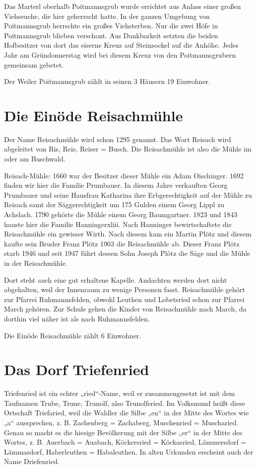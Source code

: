 \documentclass[12pt,a4pager]{book}
\begin{document}
Das Marterl oberhalb Poitmannsgrub wurde errichtet aus Anlass einer großen
Viehseuche, die hier geherrscht hatte. In der ganzen Umgebung von Poitmannsgrub
herrschte ein großes Viehsterben. Nur die zwei Höfe in Poitmannsgrub blieben
verschont. Aus Dankbarkeit setzten die beiden Hofbesitzer von dort das eiserne
Kreuz auf Steinsockel auf die Anhöhe. Jedes Jahr am Gründonnerstag wird bei
diesem Kreuz von den Poitmannsgrubern gemeinsam gebetet.

Der Weiler Poitmannsgrub zählt in seinen 3 Häusern 19 Einwohner.

\section{Die Einöde Reisachmühle}

Der Name Reisachmühle wird schon 1295 genannt. Das Wort Reisach wird abgeleitet
von Ris, Reis, Reiser = Busch. Die Reisachmühle ist also die Mühle im oder am
Buschwald.

Reisach-Mühle: 1660 war der Besitzer dieser Mühle ein Adam Oischinger. 1692
finden wir hier die Familie Prumbauer. In diesem Jahre verkauften Georg
Prumbauer und seine Hausfrau Katharina ihre Erbgerechtigkeit auf der Mühle zu
Reisach samt der Säggerechtigkeit um 175 Gulden einem Georg Lippl zu Achslach.
1790 gehörte die Mühle einem Georg Baumgartner. 1823 und 1843 hauste hier die
Familie Hanningerxliii. Nach Hanninger bewirtschaftete die Reisachmühle ein
gewisser Wirth. Nach diesem kam ein Martin Plötz und diesem kaufte sein Bruder
Franz Plötz 1903 die Reisachmühle ab. Dieser Franz Plötz starb 1946 und seit
1947 führt dessen Sohn Joseph Plötz die Säge und die Mühle in der Reisachmühle.

Dort steht auch eine gut erhaltene Kapelle. Andachten werden dort nicht
abgehalten, weil der Innenraum zu wenige Personen fasst. Reisachmühle gehört zur
Pfarrei Ruhmannsfelden, obwohl Leuthen und Lobetsried schon zur Pfarrei March
gehören. Zur Schule gehen die Kinder von Reisachmühle nach March, da dorthin
viel näher ist als nach Ruhmannsfelden.

Die Einöde Reisachmühle zählt 6 Einwohner.

\section{Das Dorf Triefenried}

Triefenried ist ein echter „ried“-Name, weil er zusammengesetzt ist mit dem
Taufnamen Trube, Trune, Trunolf, also Trunolfsried. Im Volksmund heißt diese
Ortschaft Triefaried, weil die Waldler die Silbe „en“ in der Mitte des Wortes
wie „a“ aussprechen, z. B. Zachenberg = Zachaberg, Muschenried = Muscharied.
Genau so macht es die hiesige Bevölkerung mit der Silbe „er“ in der Mitte des
Wortes, z. B. Auerbach = Auabach, Köckersried = Köckasried, Lämmersdorf =
Lämmasdorf, Haberleuthen = Habaleuthen. In alten Urkunden erscheint auch der
Name Driefenried.
\end{document}
